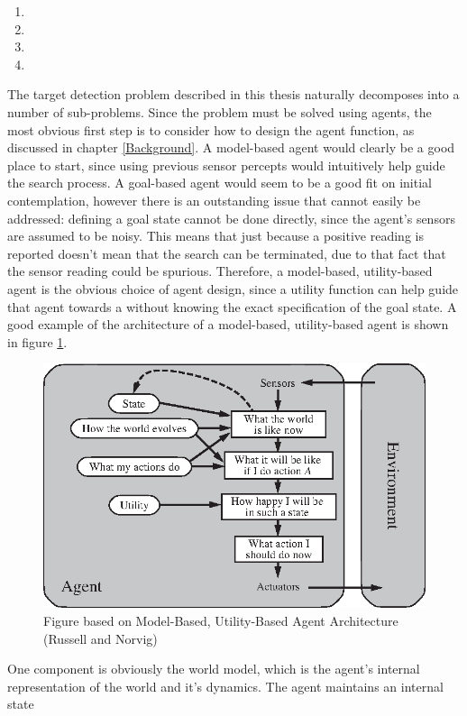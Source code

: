 \begin{enumerate}
    \item 
    \item 
    \item 
    \item 
\end{enumerate}

The target detection problem described in this thesis naturally decomposes into a number of sub-problems. %
Since the problem must be solved using agents, the most obvious first step is to consider how to design the agent function, as discussed in chapter \ref{Background}. A model-based agent would clearly be a good place to start, since using previous sensor percepts would intuitively help guide the search process. A goal-based agent would seem to be a good fit on initial contemplation, however there is an outstanding issue that cannot easily be addressed: defining a goal state cannot be done directly, since the agent's sensors are assumed to be noisy. This means that just because a positive reading is reported doesn't mean that the search can be terminated, due to that fact that the sensor reading could be spurious. Therefore, a model-based, utility-based agent is the obvious choice of agent design, since a utility function can help guide that agent towards a  without knowing the exact specification of the goal state. A good example of the architecture of a model-based, utility-based agent is shown in figure \ref{fig:model_based_utility_based}.
\begin{figure}
    \centering
    \includegraphics{Chapters/MultiAgentTargetDetection/BayesianFiltering/Figs/utility-based-agent.eps}
    \caption{Figure based on Model-Based, Utility-Based Agent Architecture (Russell and Norvig)\cite[p.~54]{AIAMA}}
    \label{fig:model_based_utility_based}
\end{figure}
One component is obviously the world model, which is the agent's internal representation of the world and it's dynamics. The agent maintains an internal state
